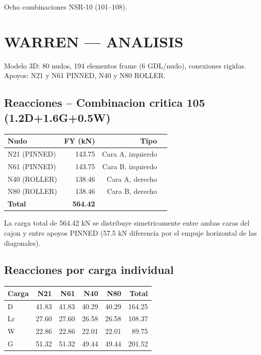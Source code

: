 \documentclass[12pt,a4paper]{article}
\newcommand{\tableheadrow}{\rowcolor{primary!15}\sffamily\footnotesize\bfseries\color{primary}}
\newcommand{\tabletotalrow}{\rowcolor{secondary!10}\sffamily\bfseries}
\begin{document}
Ocho combinaciones NSR-10 (101--108).

\section{WARREN --- ANALISIS}
Modelo 3D: 80 nudos, 194 elementos frame (6 GDL/nudo), conexiones rigidas.
Apoyos: N21 y N61 PINNED, N40 y N80 ROLLER.

\subsection{Reacciones -- Combinacion critica 105 (1.2D+1.6G+0.5W)}
\begin{center}
\begin{tabular}{l r r r}
\toprule
\tableheadrow
\textbf{Nudo} & \textbf{FY (kN)} & \textbf{Tipo} \\
\midrule
N21 (PINNED)  & 143.75 & Cara A, izquierdo \\
N61 (PINNED)  & 143.75 & Cara B, izquierdo \\
N40 (ROLLER)  & 138.46 & Cara A, derecho \\
\rowcolor{tablerow}
N80 (ROLLER)  & 138.46 & Cara B, derecho \\
\midrule
\tabletotalrow
\textbf{Total} & \textbf{564.42} & \\
\bottomrule
\end{tabular}
\end{center}

La carga total de 564.42 kN se distribuye simetricamente entre ambas caras del cajon
y entre apoyos PINNED (57.5 kN diferencia por el empuje horizontal de las diagonales).

\subsection{Reacciones por carga individual}
\begin{center}
\begin{tabular}{l r r r r r}
\toprule
\tableheadrow
\textbf{Carga} & \textbf{N21} & \textbf{N61} & \textbf{N40} & \textbf{N80} & \textbf{Total} \\
\midrule
D  & 41.83 & 41.83 & 40.29 & 40.29 & 164.25 \\
Lr & 27.60 & 27.60 & 26.58 & 26.58 & 108.37 \\
\rowcolor{tablerow}
W  & 22.86 & 22.86 & 22.01 & 22.01 &  89.75 \\
G  & 51.32 & 51.32 & 49.44 & 49.44 & 201.52 \\
\bottomrule
\end{tabular}
\end{center}
\end{document}
